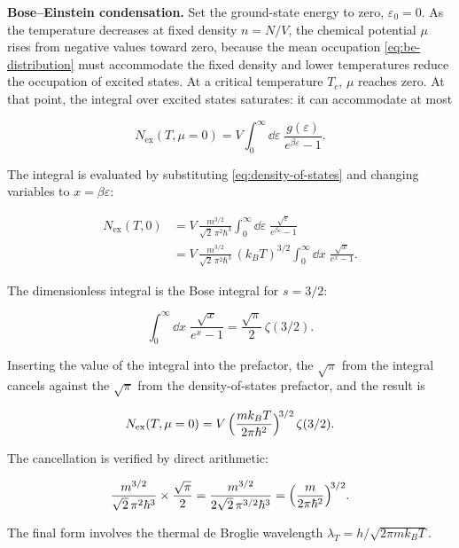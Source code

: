 \medskip\noindent\textbf{Bose--Einstein condensation.}
Set the ground-state energy to zero, $\varepsilon_0 = 0$. As the temperature decreases at fixed density $n = N/V$, the chemical potential $\mu$ rises from negative values toward zero, because the mean occupation \eqref{eq:be-distribution} must accommodate the fixed density and lower temperatures reduce the occupation of excited states. At a critical temperature $T_c$, $\mu$ reaches zero. At that point, the integral over excited states saturates: it can accommodate at most
\begin{linenomath}
    \begin{equation}
        N_{\text{ex}}(T, \mu = 0)
        = V\int_0^\infty\!\dd\varepsilon\;
          \frac{g(\varepsilon)}{e^{\beta\varepsilon} - 1}.
    \end{equation}
\end{linenomath}
The integral is evaluated by substituting \eqref{eq:density-of-states} and changing variables to $x = \beta\varepsilon$:
\begin{linenomath}
    \begin{align*}
        N_{\text{ex}}(T, 0)
        &= V\,\frac{m^{3/2}}{\sqrt{2}\,\pi^2\hbar^3}
           \int_0^\infty\!\dd\varepsilon\;
           \frac{\sqrt{\varepsilon}}{e^{\beta\varepsilon} - 1} \\[4pt]
        &= V\,\frac{m^{3/2}}{\sqrt{2}\,\pi^2\hbar^3}\,
           (k_B T)^{3/2}
           \int_0^\infty\!\dd x\;\frac{\sqrt{x}}{e^x - 1}.
    \end{align*}
\end{linenomath}
The dimensionless integral is the Bose integral for $s = 3/2$:
\begin{linenomath}
    \begin{equation*}
        \int_0^\infty\!\dd x\;\frac{\sqrt{x}}{e^x - 1}
        = \frac{\sqrt{\pi}}{2}\,\zeta(3/2).
    \end{equation*}
\end{linenomath}
Inserting the value of the integral into the prefactor, the $\sqrt{\pi}$ from the integral cancels against the $\sqrt{\pi}$ from the density-of-states prefactor, and the result is
\begin{linenomath}
    \begin{equation}
        N_{\text{ex}}(T, \mu = 0)
        = V\,\Bigl(\frac{m k_B T}{2\pi\hbar^2}\Bigr)^{\!3/2}\,\zeta(3/2).
    \end{equation}
\end{linenomath}
The cancellation is verified by direct arithmetic:
\begin{linenomath}
    \begin{equation*}
        \frac{m^{3/2}}{\sqrt{2}\,\pi^2\hbar^3}\times\frac{\sqrt{\pi}}{2}
        = \frac{m^{3/2}}{2\sqrt{2}\,\pi^{3/2}\hbar^3}
        = \Bigl(\frac{m}{2\pi\hbar^2}\Bigr)^{\!3/2}.
    \end{equation*}
\end{linenomath}
The final form involves the thermal de Broglie wavelength $\lambda_T = h/\sqrt{2\pi m k_B T}$.

